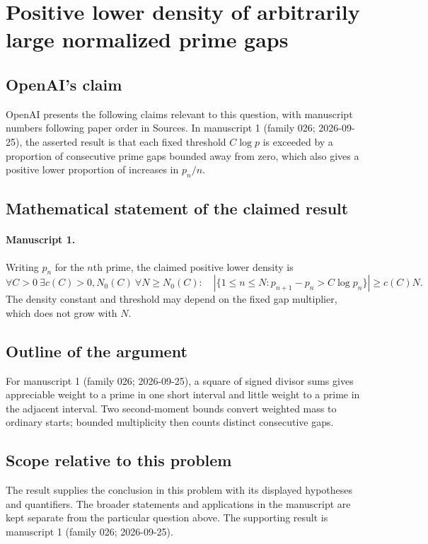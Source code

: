 \documentclass[11pt]{article}
\begin{document}
\section*{Positive lower density of arbitrarily large normalized prime gaps}

\subsection{OpenAI's claim}
OpenAI presents the following claims relevant to this question, with manuscript numbers following paper order in Sources. In manuscript 1 (family 026; 2026-09-25), the asserted result is that each fixed threshold $C\log p$ is exceeded by a proportion of consecutive prime gaps bounded away from zero, which also gives a positive lower proportion of increases in $p_n/n$.

\subsection{Mathematical statement of the claimed result}
\paragraph{Manuscript 1.}
Writing $p_n$ for the $n$th prime, the claimed positive lower density is
\[
 \forall C>0\ \exists c(C)>0,N_0(C)\ \forall N\ge N_0(C):
 \quad|\{1\le n\le N:p_{n+1}-p_n>C\log p_n\}|\ge c(C)N.
\]
The density constant and threshold may depend on the fixed gap multiplier, which does not grow with $N$.

\subsection{Outline of the argument}
For manuscript 1 (family 026; 2026-09-25), a square of signed divisor sums gives appreciable weight to a prime in one short interval and little weight to a prime in the adjacent interval. Two second-moment bounds convert weighted mass to ordinary starts; bounded multiplicity then counts distinct consecutive gaps.

\subsection{Scope relative to this problem}
The result supplies the conclusion in this problem with its displayed hypotheses and quantifiers. The broader statements and applications in the manuscript are kept separate from the particular question above. The supporting result is manuscript 1 (family 026; 2026-09-25).
\end{document}
